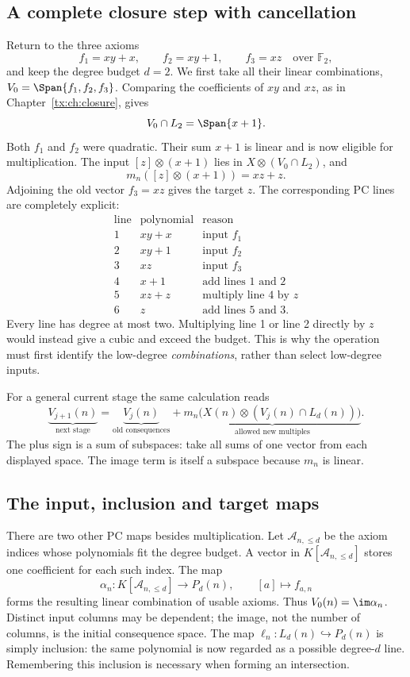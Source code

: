 \subsection{A complete closure step with cancellation}
Return to the three axioms
\[
 f_1=xy+x,\qquad f_2=xy+1,\qquad f_3=xz
                         \quad\text{over }\mathbb F_2,
\]
and keep the degree budget $d=2$. We first take all their linear
combinations, $V_0=\Span\{f_1,f_2,f_3\}$. Comparing the coefficients
of $xy$ and $xz$, as in Chapter~\ref{tx:ch:closure}, gives
\[
                         V_0\cap L_2=\Span\{x+1\}.
\]
Both $f_1$ and $f_2$ were quadratic. Their sum $x+1$ is linear
and is now eligible for multiplication.
The input $[z]\otimes(x+1)$ lies in
$X\otimes(V_0\cap L_2)$, and
\[
                 m_n([z]\otimes(x+1))=xz+z.
\]
Adjoining the old vector $f_3=xz$ gives the target $z$.
The corresponding PC lines are completely explicit:
\[
 \begin{array}{c|l|l}
 \text{line}&\text{polynomial}&\text{reason}\\ \hline
 1&xy+x&\text{input }f_1\\
 2&xy+1&\text{input }f_2\\
 3&xz&\text{input }f_3\\
 4&x+1&\text{add lines 1 and 2}\\
 5&xz+z&\text{multiply line 4 by }z\\
 6&z&\text{add lines 5 and 3}.
 \end{array}
\]
Every line has degree at most two. Multiplying line 1 or line 2
directly by $z$ would instead give a cubic and exceed the budget.
This is why the operation must first identify the low-degree
\emph{combinations}, rather than select low-degree inputs.

For a general current stage the same calculation reads
\[
 \underbrace{V_{j+1}(n)}_{\text{next stage}}
 =\underbrace{V_j(n)}_{\text{old consequences}}
  +\underbrace{m_n\bigl(X(n)\otimes
                   (V_j(n)\cap L_d(n))\bigr)}_{\text{allowed new multiples}}.
\]
The plus sign is a sum of subspaces: take all sums of one vector
from each displayed space. The image term is itself a subspace
because $m_n$ is linear.

\subsection{The input, inclusion and target maps}
There are two other PC maps besides multiplication.
Let $\mathcal A_{n,\le d}$ be the axiom indices whose polynomials
fit the degree budget. A vector in $K[\mathcal A_{n,\le d}]$
stores one coefficient for each such index. The map
\[
        \alpha_n:K[\mathcal A_{n,\le d}]\to P_d(n),
                  \qquad [a]\mapsto f_{a,n}
\]
forms the resulting linear combination of usable axioms.
Thus $V_0(n)=\im\alpha_n$. Distinct input columns may be dependent;
the image, not the number of columns, is the initial consequence space.
The map
$\ell_n:L_d(n)\hookrightarrow P_d(n)$ is simply inclusion:
the same polynomial is now regarded as a possible degree-$d$ line.
Remembering this inclusion is necessary when forming an intersection.

